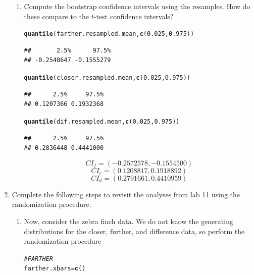 \documentclass{article}\usepackage[]{graphicx}\usepackage[]{xcolor}
\makeatletter
\newcommand{\hlnum}[1]{\textcolor[rgb]{0.686,0.059,0.569}{#1}}%
\newcommand{\hlcom}[1]{\textcolor[rgb]{0.678,0.584,0.686}{\textit{#1}}}%
\newcommand{\hldef}[1]{\textcolor[rgb]{0.345,0.345,0.345}{#1}}%
\newcommand{\hlkwb}[1]{\textcolor[rgb]{0.69,0.353,0.396}{#1}}%
\newcommand{\hlkwd}[1]{\textcolor[rgb]{0.737,0.353,0.396}{\textbf{#1}}}%
\newenvironment{kframe}{%
 \def\at@end@of@kframe{}%
 \ifinner\ifhmode%
  \def\at@end@of@kframe{\end{minipage}}%
  \begin{minipage}{\columnwidth}%
 \fi\fi%
 \def\FrameCommand##1{\hskip\@totalleftmargin \hskip-\fboxsep
 \colorbox{shadecolor}{##1}\hskip-\fboxsep
     \hskip-\linewidth \hskip-\@totalleftmargin \hskip\columnwidth}%
 \MakeFramed {\advance\hsize-\width
   \@totalleftmargin\z@ \linewidth\hsize
   \@setminipage}}%
 {\par\unskip\endMakeFramed%
 \at@end@of@kframe}
\newenvironment{knitrout}{}{} %
\makeatother
\begin{document}
\begin{enumerate}
\begin{enumerate}
  \item Compute the bootstrap confidence intervals using the resamples. How do these 
  compare to the $t$-test confidence intervals?
\begin{knitrout}\scriptsize
{}\color{fgcolor}\begin{kframe}
\begin{alltt}
\hlkwd{quantile}\hldef{(farther.resampled.mean,} \hlkwd{c}\hldef{(}\hlnum{0.025}\hldef{,}\hlnum{0.975}\hldef{))}
\end{alltt}
\begin{verbatim}
##       2.5%      97.5% 
## -0.2548647 -0.1555279
\end{verbatim}
\begin{alltt}
\hlkwd{quantile}\hldef{(closer.resampled.mean,} \hlkwd{c}\hldef{(}\hlnum{0.025}\hldef{,}\hlnum{0.975}\hldef{))}
\end{alltt}
\begin{verbatim}
##      2.5%     97.5% 
## 0.1207366 0.1932368
\end{verbatim}
\begin{alltt}
\hlkwd{quantile}\hldef{(dif.resampled.mean,} \hlkwd{c}\hldef{(}\hlnum{0.025}\hldef{,}\hlnum{0.975}\hldef{))}
\end{alltt}
\begin{verbatim}
##      2.5%     97.5% 
## 0.2836448 0.4441000
\end{verbatim}
\end{kframe}
\end{knitrout}
\[CI_f = (-0.2572578, -0.1554500 )\]
\[CI_c = (0.1208817, 0.1918892 )\]
\[CI_d = (0.2791661, 0.4410959 )\]

\end{enumerate}
\item Complete the following steps to revisit the analyses from lab 11 using the
randomization procedure.
\begin{enumerate}
\item Now, consider the zebra finch data. We do not know the generating distributions
for the closer, further, and difference data, so perform the randomization procedure
\begin{knitrout}\scriptsize
{}\color{fgcolor}\begin{kframe}
\begin{alltt}
\hlcom{#FARTHER}
\hldef{farther.xbars} \hlkwb{=} \hlkwd{c}\hldef{()}


\end{alltt}
\end{kframe}
\end{knitrout}
\end{enumerate}
\end{enumerate}
\end{document}
